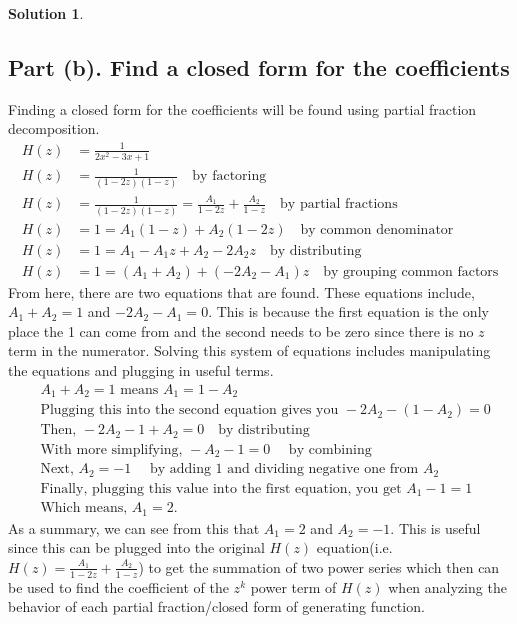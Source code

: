\documentclass{article}
\theoremstyle{definition}
\newtheorem*{solution}{Solution}
\begin{document}
\begin{solution}
\subsection*{Part (b). Find a closed form for the coefficients}
Finding a closed form for the coefficients will be found using partial fraction decomposition.
\begin{align*}
H(z) &= \frac{1}{2x^2-3x+1}\\
H(z) &= \frac{1}{(1-2z)(1-z)} \quad \mbox{by factoring}\\
H(z) &= \frac{1}{(1-2z)(1-z)} = \frac{A_1}{1-2z} + \frac{A_2}{1-z} \quad \mbox{by partial fractions}\\
H(z) &= 1 = A_1(1-z) + A_2(1-2z) \quad \mbox{by common denominator}\\
H(z) &= 1 = A_1 - A_1z + A_2 - 2A_2z \quad \mbox{by distributing}\\
H(z) &= 1 = (A_1 + A_2) + (-2A_2 - A_1)z \quad \mbox{by grouping common factors}
\end{align*}
From here, there are two equations that are found. These equations include, $A_1 + A_2 = 1$ and $-2A_2 - A_1 = 0$. This is because the first equation is the only place the 1 can come from and the second needs to be zero since there is no $z$ term in the numerator. Solving this system of equations includes manipulating the equations and plugging in useful terms.
\begin{align*}
&A_1 + A_2 = 1 \mbox{ means } A_1 = 1 - A_2\\
&\mbox{Plugging this into the second equation gives you } -2A_2 - (1-A_2) = 0\\
&\mbox{Then, }-2A_2 -1 + A_2 = 0 \quad \mbox{by distributing}\\
&\mbox{With more simplifying, } -A_2 - 1 = 0 \quad \mbox{ by combining}\\
&\mbox{Next, } A_2 = -1 \quad \mbox{ by adding 1 and dividing negative one from $A_2$}\\
&\mbox{Finally, plugging this value into the first equation, you get } A_1 - 1 = 1\\
&\mbox{Which means, } A_1 = 2.
\end{align*}
As a summary, we can see from this that $A_1 = 2$ and $A_2 = -1$. This is useful since this can be plugged into the original $H(z)$ equation(i.e. $H(z) = \frac{A_1}{1-2z} + \frac{A_2}{1-z}$) to get the summation of two power series which then can be used to find the coefficient of the $z^k$ power term of $H(z)$ when analyzing the behavior of each partial fraction/closed form of generating function.

\end{solution}
\end{document}
